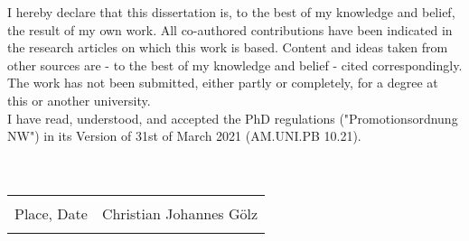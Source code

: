 I hereby declare that this dissertation is, to the best of my knowledge and belief, the result of my own work. All co-authored contributions have been indicated in the research articles on which this work is based. Content and ideas taken from other sources are - to the best of my knowledge and belief - cited correspondingly. The work has not been submitted, either 
partly or completely, for a degree at this or another university.\\
I have read, understood, and accepted the PhD regulations ("Promotionsordnung NW") in its Version of 31st of March 2021 (AM.UNI.PB 10.21).\\
\\
\\
\noindent
\begin{tabular}{@{}p{2.5in}p{2.5in}@{}}
  \dotfill & \dotfill \\
  Place, Date & Christian Johannes Gölz \\
  & \\[8ex]
\end{tabular}

